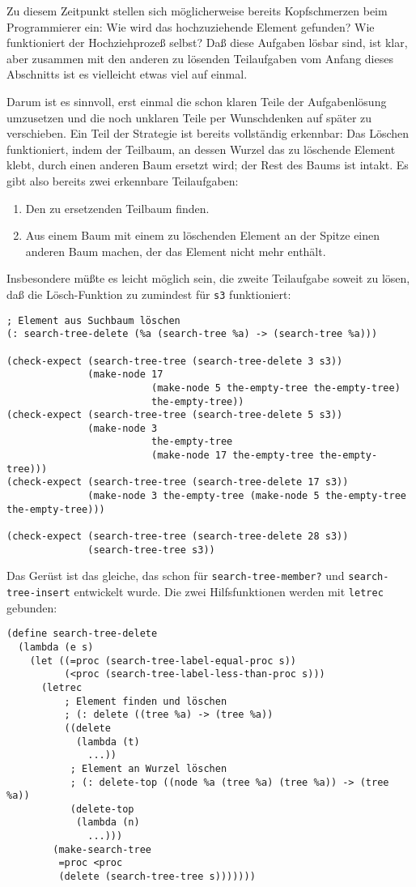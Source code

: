 Zu diesem Zeitpunkt stellen sich möglicherweise bereits Kopfschmerzen
beim Programmierer ein: Wie wird das hochzuziehende Element gefunden?
Wie funktioniert der Hochziehprozeß selbst?  Daß diese Aufgaben lösbar
sind, ist klar, aber zusammen mit den anderen zu lösenden Teilaufgaben
vom Anfang dieses Abschnitts ist es vielleicht etwas viel auf einmal.

Darum ist es sinnvoll, erst einmal die schon klaren Teile der
Aufgabenlösung umzusetzen und die noch unklaren Teile per Wunschdenken
auf später zu verschieben.  Ein Teil der Strategie ist bereits
vollständig erkennbar: Das Löschen funktioniert, indem der Teilbaum,
an dessen Wurzel das zu löschende Element klebt, durch einen anderen
Baum ersetzt wird; der Rest des Baums ist intakt.  Es gibt also
bereits zwei erkennbare Teilaufgaben:
%
\begin{enumerate}
\item Den zu ersetzenden Teilbaum finden.
\item Aus einem Baum mit einem zu löschenden Element an der Spitze
  einen anderen Baum machen, der das Element nicht mehr enthält.
\end{enumerate}
%
Insbesondere müßte es leicht möglich sein, die zweite Teilaufgabe
soweit zu lösen, daß die Lösch-Funktion zu zumindest für \texttt{s3}
funktioniert:
%
\begin{verbatim}
; Element aus Suchbaum löschen
(: search-tree-delete (%a (search-tree %a) -> (search-tree %a)))

(check-expect (search-tree-tree (search-tree-delete 3 s3))
              (make-node 17
                         (make-node 5 the-empty-tree the-empty-tree)
                         the-empty-tree))
(check-expect (search-tree-tree (search-tree-delete 5 s3))
              (make-node 3
                         the-empty-tree
                         (make-node 17 the-empty-tree the-empty-tree)))
(check-expect (search-tree-tree (search-tree-delete 17 s3))
              (make-node 3 the-empty-tree (make-node 5 the-empty-tree the-empty-tree)))

(check-expect (search-tree-tree (search-tree-delete 28 s3))
              (search-tree-tree s3))
\end{verbatim}
%
Das Gerüst ist das gleiche, das schon für \texttt{search-tree-member?}
und \texttt{search-tree-insert} entwickelt wurde.  Die zwei
Hilfsfunktionen werden mit \texttt{letrec} gebunden:
%
\begin{verbatim}
(define search-tree-delete
  (lambda (e s)
    (let ((=proc (search-tree-label-equal-proc s))
          (<proc (search-tree-label-less-than-proc s)))
      (letrec
          ; Element finden und löschen
          ; (: delete ((tree %a) -> (tree %a))
          ((delete
            (lambda (t)
              ...))
           ; Element an Wurzel löschen
           ; (: delete-top ((node %a (tree %a) (tree %a)) -> (tree %a))
           (delete-top
            (lambda (n)
              ...)))
        (make-search-tree
         =proc <proc
         (delete (search-tree-tree s)))))))
\end{verbatim}
